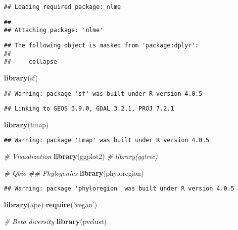 \documentclass[
]{article}
\newenvironment{Shaded}{\begin{snugshade}}{\end{snugshade}}
\newcommand{\CommentTok}[1]{\textcolor[rgb]{0.56,0.35,0.01}{\textit{#1}}}
\newcommand{\KeywordTok}[1]{\textcolor[rgb]{0.13,0.29,0.53}{\textbf{#1}}}
\newcommand{\NormalTok}[1]{#1}
\newcommand{\StringTok}[1]{\textcolor[rgb]{0.31,0.60,0.02}{#1}}
\begin{document}
\begin{verbatim}
## Loading required package: nlme
\end{verbatim}

\begin{verbatim}
## 
## Attaching package: 'nlme'
\end{verbatim}

\begin{verbatim}
## The following object is masked from 'package:dplyr':
## 
##     collapse
\end{verbatim}

\begin{Shaded}
\begin{Highlighting}[]
\KeywordTok{library}\NormalTok{(sf)}
\end{Highlighting}
\end{Shaded}

\begin{verbatim}
## Warning: package 'sf' was built under R version 4.0.5
\end{verbatim}

\begin{verbatim}
## Linking to GEOS 3.9.0, GDAL 3.2.1, PROJ 7.2.1
\end{verbatim}

\begin{Shaded}
\begin{Highlighting}[]
\KeywordTok{library}\NormalTok{(tmap)}
\end{Highlighting}
\end{Shaded}

\begin{verbatim}
## Warning: package 'tmap' was built under R version 4.0.5
\end{verbatim}

\begin{Shaded}
\begin{Highlighting}[]
\CommentTok{# Visualization}
\KeywordTok{library}\NormalTok{(ggplot2)}
\CommentTok{# library(ggtree)}

\CommentTok{# Qbio}
\CommentTok{## Phylogenies}
\KeywordTok{library}\NormalTok{(phyloregion)}
\end{Highlighting}
\end{Shaded}

\begin{verbatim}
## Warning: package 'phyloregion' was built under R version 4.0.5
\end{verbatim}

\begin{Shaded}
\begin{Highlighting}[]
\KeywordTok{library}\NormalTok{(ape)}
\KeywordTok{require}\NormalTok{(}\StringTok{'vegan'}\NormalTok{)}

\CommentTok{# Beta diversity}
\KeywordTok{library}\NormalTok{(pvclust)}
\end{Highlighting}
\end{Shaded}
\end{document}
